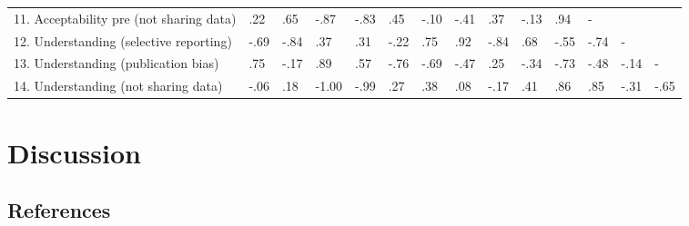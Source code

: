 \documentclass[
  man,floatsintext]{apa7}
\newenvironment{lltable}{\begin{landscape}\centering\begin{ThreePartTable}}{\end{ThreePartTable}\end{landscape}}
\begin{document}
\begin{lltable}
\begin{longtable}{llllllllllllll}
11. Acceptability pre (not sharing data) & .22 & .65 & -.87 & -.83 & .45 & -.10 & -.41 & .37 & -.13 & .94 & - &  & \\
12. Understanding (selective reporting) & -.69 & -.84 & .37 & .31 & -.22 & .75 & .92 & -.84 & .68 & -.55 & -.74 & - & \\
13. Understanding (publication bias) & .75 & -.17 & .89 & .57 & -.76 & -.69 & -.47 & .25 & -.34 & -.73 & -.48 & -.14 & -\\
14. Understanding (not sharing data) & -.06 & .18 & -1.00 & -.99 & .27 & .38 & .08 & -.17 & .41 & .86 & .85 & -.31 & -.65\\
\bottomrule
\end{longtable}

\end{lltable}

\hypertarget{discussion}{%
\section{Discussion}\label{discussion}}

\newpage

\begingroup
\setlength{\parindent}{-0.5in}
\setlength{\leftskip}{0.5in}

\hypertarget{references}{%
\subsection{References}\label{references}}
\end{document}
